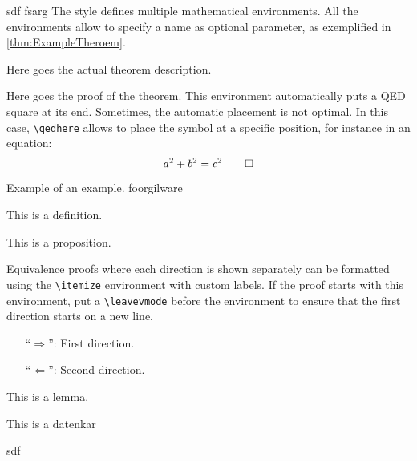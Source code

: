 sdf
fsarg
The style defines multiple mathematical environments. All the environments allow to specify a name as optional parameter, as exemplified in \cref{thm:ExampleTheroem}.
\begin{Thm}
\label{thm:ExampleTheroem}
Here goes the actual theorem description.
\end{Thm}
\begin{Proof}
Here goes the proof of the theorem. This environment automatically puts a QED square at its end. Sometimes, the automatic placement is not optimal. In this case, \texttt{\textbackslash qedhere} allows to place the symbol at a specific position, for instance in an equation:
\[a^2+b^2=c^2\qedhere\]
\end{Proof}
\begin{Exp}Example of an example. foorgilware
\end{Exp}
\begin{Def}This is a definition.
\end{Def}
\begin{Prop}This is a proposition.
\end{Prop}
Equivalence proofs where each direction is shown separately can be formatted using the \texttt{\textbackslash itemize} environment with custom labels. If the proof starts with this environment, put a \texttt{\textbackslash leavevmode} before the environment to ensure that the first direction starts on a new line.
\begin{Proof}\leavevmode
\begin{itemize}[beginpenalty=10000,leftmargin=7ex]
\item[\enquote{$\Rightarrow$}:] First direction.
\item[\enquote{$\Leftarrow$}:] Second direction.\qedhere
\end{itemize}
\end{Proof}

\begin{Lem}This is a lemma.
\end{Lem}
\begin{Cor}This is a datenkar
\end{Cor}



\begin{procedure}
    sdf
\end{procedure}
\begin{problem}
    
\end{problem}
















































